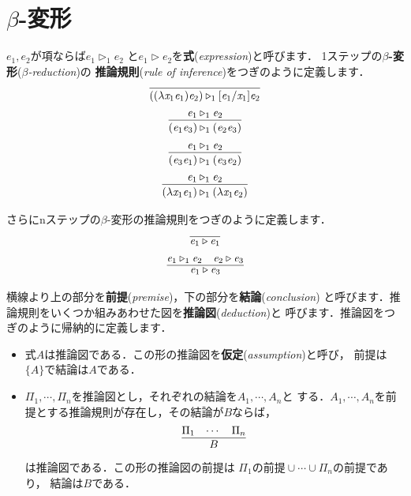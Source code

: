 \documentclass{ltjsbook}%
\newcommand\term[2]{\textbf{#1}{(\textit{#2})}}%
\begin{document}
\section{$\beta$-変形}%
\label{sect:beta}%
$\mathit{e}_1,\mathit{e}_2$が項ならば$\mathit{e}_1\triangleright_1\mathit{e}_2$%
と$\mathit{e}_1\triangleright\mathit{e}_2$を\term{式}{expression}と呼びます．%
1ステップの\term{$\beta$-変形}{$\beta$-reduction}の%
\term{推論規則}{rule of inference}をつぎのように定義します．%
\begin{equation}%
  \infer{%
    ((\lambda\mathit{x}_1\mathit{e}_1)\mathit{e}_2)\triangleright_1%
    [\mathit{e}_1/\mathit{x}_1]\mathit{e}_2
  }{%
  }%
\end{equation}%
\begin{equation}%
  \infer{%
    (\mathit{e}_1\mathit{e}_3)\triangleright_1(\mathit{e}_2\mathit{e}_3)%
  }{%
    \mathit{e}_1\triangleright_1\mathit{e}_2%
  }%
\end{equation}%
\begin{equation}%
  \infer{%
    (\mathit{e}_3\mathit{e}_1)\triangleright_1(\mathit{e}_3\mathit{e}_2)%
  }{%
    \mathit{e}_1\triangleright_1\mathit{e}_2%
  }%
\end{equation}%
\begin{equation}%
  \infer{%
    (\lambda\mathit{x}_1\mathit{e}_1)\triangleright_1%
    (\lambda\mathit{x}_1\mathit{e}_2)%
  }{%
    \mathit{e}_1\triangleright_1\mathit{e}_2%
  }%
\end{equation}%
\par さらにnステップの$\beta$-変形の推論規則をつぎのように定義します．%
\begin{equation}%
  \infer{%
    \mathit{e}_1\triangleright\mathit{e}_1%
  }{%
  }%
\end{equation}%
\begin{equation}%
  \infer{%
    \mathit{e}_1\triangleright\mathit{e}_3%
  }{%
    \mathit{e}_1\triangleright_1\mathit{e}_2%
  &%
    \mathit{e}_2\triangleright\mathit{e}_3%
  }%
\end{equation}%
\par 横線より上の部分を\term{前提}{premise}，下の部分を\term{結論}{conclusion}%
と呼びます．推論規則をいくつか組みあわせた図を\term{推論図}{deduction}と%
呼びます．推論図をつぎのように帰納的に定義します．%
\begin{itemize}%
\item 式$A$は推論図である．この形の推論図を\term{仮定}{assumption}と呼び，%
  前提は$\{A\}$で結論は$A$である．%
\item $\Pi_1,\cdots,\Pi_n$を推論図とし，それぞれの結論を$A_1,\cdots,A_n$と%
  する．$A_1,\cdots,A_n$を前提とする推論規則が存在し，その結論が$B$ならば，%
  \begin{equation}%
    \infer{B}{\Pi_1&\cdots&\Pi_n}%
  \end{equation}%
  は推論図である．この形の推論図の前提は%
  $\Pi_1の前提\cup\cdots\cup\Pi_nの前提$であり，%
  結論は$B$である．%
\end{itemize}%
\end{document}
